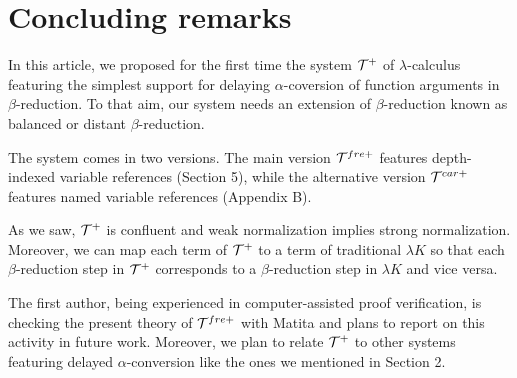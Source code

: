 \section{Concluding remarks}
\label{sec:conclusion}

In this article, we proposed for the first time the system $\cal{T}^{+}$ of
$\lambda$-calculus featuring the simplest support for delaying
$\alpha$-coversion of function arguments in $\beta$-reduction.
To that aim, our system needs an extension of $\beta$-reduction known
as balanced or distant $\beta$-reduction.

The system comes in two versions.
The main version $\mathcal{T}^{fre+}$ features depth-indexed variable references (Section 5),
while the alternative version $\mathcal{T}^{car+}$ features named variable references (Appendix B).

As we saw, $\cal{T}^{+}$ is confluent
and weak normalization implies strong normalization.
Moreover, we can map each term of $\cal{T}^{+}$ to a term of
traditional $\lambda K$ so that each $\beta$-reduction step in $\cal{T}^{+}$
corresponds to a $\beta$-reduction step in $\lambda K$ and vice versa.

The first author, being experienced in computer-assisted proof verification,
is checking the present theory of $\mathcal{T}^{fre+}$ with Matita \cite{ARST11}
and plans to report on this activity in future work.
Moreover, we plan to relate $\cal{T}^{+}$ to
other systems featuring delayed $\alpha$-conversion
like the ones we mentioned in Section 2.
